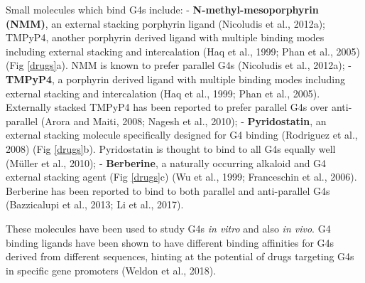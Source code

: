\documentclass[12pt,a4paper,]{report}
\begin{document}
Small molecules which bind G4s include: - \textbf{N-methyl-mesoporphyrin
(NMM)}, an external stacking porphyrin ligand (Nicoludis et al., 2012a);
TMPyP4, another porphyrin derived ligand with multiple binding modes
including external stacking and intercalation (Haq et al., 1999; Phan et
al., 2005) (Fig \ref{drugs}a). NMM is known to prefer parallel G4s
(Nicoludis et al., 2012a); - \textbf{TMPyP4}, a porphyrin derived ligand
with multiple binding modes including external stacking and
intercalation (Haq et al., 1999; Phan et al., 2005). Externally stacked
TMPyP4 has been reported to prefer parallel G4s over anti-parallel
(Arora and Maiti, 2008; Nagesh et al., 2010); - \textbf{Pyridostatin},
an external stacking molecule specifically designed for G4 binding
(Rodriguez et al., 2008) (Fig \ref{drugs}b). Pyridostatin is thought to
bind to all G4s equally well (Müller et al., 2010); -
\textbf{Berberine}, a naturally occurring alkaloid and G4 external
stacking agent (Fig \ref{drugs}c) (Wu et al., 1999; Franceschin et al.,
2006). Berberine has been reported to bind to both parallel and
anti-parallel G4s (Bazzicalupi et al., 2013; Li et al., 2017).

These molecules have been used to study G4s \emph{in vitro} and also
\emph{in vivo}. G4 binding ligands have been shown to have different
binding affinities for G4s derived from different sequences, hinting at
the potential of drugs targeting G4s in specific gene promoters (Weldon
et al., 2018).

\newpage
\end{document}
